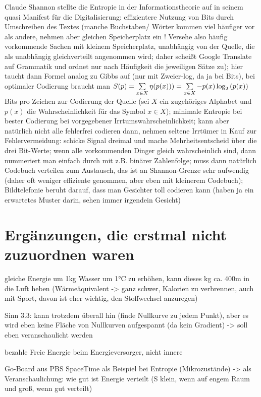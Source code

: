 \documentclass[../KlassMech_main.tex]{subfiles}
\begin{document}
Claude Shannon stellte die Entropie in der Informationstheorie auf in seinem quasi Manifest für die Digitalisierung: effizientere Nutzung von Bits durch Umschreiben des Textes (manche Buchstaben/ Wörter kommen viel häufiger vor als andere, nehmen aber gleichen Speicherplatz ein ! Versehe also häufig vorkommende Sachen mit kleinem Speicherplatz, unabhängig von der Quelle, die als unabhängig gleichverteilt angenommen wird; daher scheißt Google Translate auf Grammatik und ordnet nur nach Häufigkeit die jeweiligen Sätze zu); hier taucht dann Formel analog zu Gibbs auf (nur mit Zweier-log, da ja bei Bits), bei optimaler Codierung braucht man $S(p) = \sum\limits_{x \in X} \eta\qty(p(x))) = \sum\limits_{x \in X} -p(x) \log_2\qty(p(x))$ Bits pro Zeichen zur Codierung der Quelle (sei $X$ ein zugehöriges Alphabet und $p(x)$ die Wahrscheinlichkeit für das Symbol $x \in X$); minimale Entropie bei bester Codierung bei vorgegebener Irrtumswahrscheinlichkeit; kann aber natürlich nicht alle fehlerfrei codieren dann, nehmen seltene Irrtümer in Kauf
zur Fehlervermeidung: schicke Signal dreimal und mache Mehrheitsentscheid über die drei Bit-Werte; wenn alle vorkommenden Dinger gleich wahrscheinlich sind, dann nummeriert man einfach durch mit z.B. binärer Zahlenfolge; muss dann natürlich Codebuch verteilen zum Austausch, das ist an Shannon-Grenze sehr aufwendig (daher oft weniger effiziente genommen, aber eben mit kleinerem Codebuch); Bildtelefonie beruht darauf, dass man Gesichter toll codieren kann (haben ja ein erwartetes Muster darin, sehen immer irgendein Gesicht)



\section*{Ergänzungen, die erstmal nicht zuzuordnen waren}

gleiche Energie um 1kg Wasser um 1°C zu erhöhen, kann dieses kg ca. 400m in die Luft heben (Wärmeäquivalent -> ganz schwer, Kalorien zu verbrennen, auch mit Sport, davon ist eher wichtig, den Stoffwechsel anzuregen)

Sinn 3.3: kann trotzdem überall hin (finde Nullkurve zu jedem Punkt), aber es wird eben keine Fläche von Nullkurven aufgespannt (da kein Gradient) -> soll eben veranschaulicht werden

bezahle Freie Energie beim Energieversorger, nicht innere

Go-Board aus PBS SpaceTime als Beispiel bei Entropie (Mikrozustände)
-> als Veranschaulichung: wie gut ist Energie verteilt (S klein, wenn auf engem Raum und groß, wenn gut verteilt)
\end{document}
